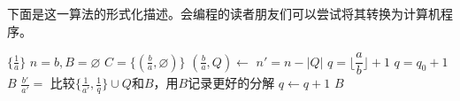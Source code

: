 下面是这一算法的形式化描述。会编程的读者朋友们可以尝试将其转换为计算机程序。

\begin{algorithmic}[1]
    \State \Return $\{\frac{1}{a}\}$
  \EndIf
  \State $n = b, B = \varnothing$
  \State $C = \{(\frac{b}{a}, \varnothing)\}$
    \State $(\frac{b}{a}, Q) \gets $   
    \State $n' = n - |Q|$                            
    \State $q = \lfloor \dfrac{a}{b} \rfloor + 1$
      
      \State $q = q_0 + 1$
    \EndIf
       
        \State \Return $B$
      \EndIf
      \State $\frac{b'}{a'} = $  
        \State 比较$\{\frac{1}{a'}, \frac{1}{q}\} \cup Q$和$B$，用$B$记录更好的分解
      \Else
        \State {} 
      \EndIf
      \State $q \gets q + 1$
    \EndWhile
  \EndWhile
  \State \Return $B$
\EndFunction
\end{algorithmic}
